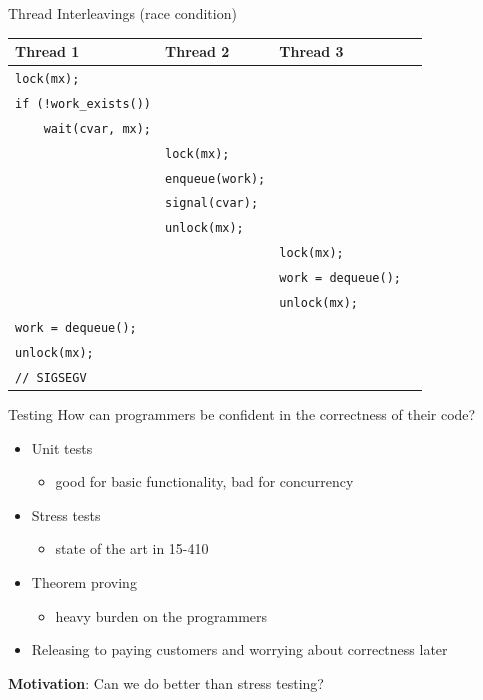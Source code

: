 \documentclass[xcolor=dvipsnames]{beamer}
\begin{document}
\begin{frame}{Thread Interleavings (race condition)}
	\begin{center}
		\begin{tabular}{|l|l|l|}
			\hline
			\cellcolor{thread1} {\bf Thread 1} & \cellcolor{thread2} {\bf Thread 2} & \cellcolor{thread3} {\bf Thread 3} \\
			\hline
			\small \texttt{lock(mx);} & & \\
			\small \texttt{if~(!work\_exists())} & & \\
			\small \texttt{~~~~wait(cvar,~mx);} & & \\
			
			& \small \texttt{lock(mx);} & \\
			& \small \texttt{enqueue(work);} & \\
			& \small \texttt{signal(cvar);} & \\
			& \small \texttt{unlock(mx);} & \\
			
			& & \small \texttt{lock(mx);} \\
			& & \small \texttt{work~=~dequeue();~~} \\
			& & \small \texttt{unlock(mx);} \\

			\small \texttt{work~=~dequeue();} & & \\
			\small \texttt{unlock(mx);} & & \\
			\small \texttt{//~SIGSEGV} {\large \frownie}& & \\
			\hline
		\end{tabular}
	\end{center}
\end{frame}


\begin{frame}{Testing}
	How can programmers be confident in the correctness of their code?
	\begin{itemize}
		\item Unit tests
		\begin{itemize}
			\item good for basic functionality, bad for concurrency
		\end{itemize}
		\item Stress tests
		\begin{itemize}
			\item state of the art in 15-410
		\end{itemize}
		\item Theorem proving
		\begin{itemize}
			\item heavy burden on the programmers
		\end{itemize}
		\item Releasing to paying customers and worrying about correctness later
	\end{itemize}
	\linegap

	{\bf Motivation}: Can we do better than stress testing?
\end{frame}
\end{document}
